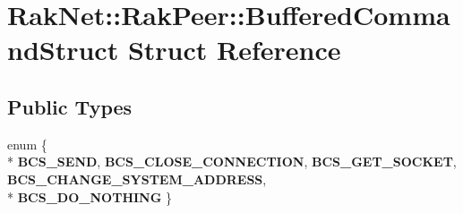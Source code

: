 \hypertarget{struct_rak_net_1_1_rak_peer_1_1_buffered_command_struct}{\section{Rak\-Net\-:\-:Rak\-Peer\-:\-:Buffered\-Command\-Struct Struct Reference}
\label{struct_rak_net_1_1_rak_peer_1_1_buffered_command_struct}
}
\subsection*{Public Types}
\begin{DoxyCompactItemize}
\item 
enum \{ \\*
{\bfseries B\-C\-S\-\_\-\-S\-E\-N\-D}, 
{\bfseries B\-C\-S\-\_\-\-C\-L\-O\-S\-E\-\_\-\-C\-O\-N\-N\-E\-C\-T\-I\-O\-N}, 
{\bfseries B\-C\-S\-\_\-\-G\-E\-T\-\_\-\-S\-O\-C\-K\-E\-T}, 
{\bfseries B\-C\-S\-\_\-\-C\-H\-A\-N\-G\-E\-\_\-\-S\-Y\-S\-T\-E\-M\-\_\-\-A\-D\-D\-R\-E\-S\-S}, 
\\*
{\bfseries B\-C\-S\-\_\-\-D\-O\-\_\-\-N\-O\-T\-H\-I\-N\-G}
 \}
\end{DoxyCompactItemize}
